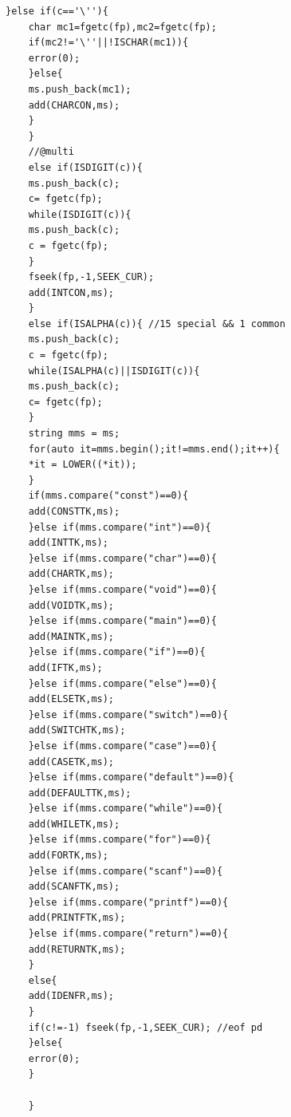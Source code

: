 \documentclass{ctexart}
\begin{document}
\begin{lstlisting}[caption=修改后核心代码]
	}else if(c=='\''){
	char mc1=fgetc(fp),mc2=fgetc(fp);
	if(mc2!='\''||!ISCHAR(mc1)){
	error(0);
	}else{
	ms.push_back(mc1);
	add(CHARCON,ms);
	}
	}
	//@multi
	else if(ISDIGIT(c)){ 
	ms.push_back(c);
	c= fgetc(fp);
	while(ISDIGIT(c)){
	ms.push_back(c);
	c = fgetc(fp);
	}
	fseek(fp,-1,SEEK_CUR);
	add(INTCON,ms);
	}
	else if(ISALPHA(c)){ //15 special && 1 common
	ms.push_back(c);
	c = fgetc(fp);
	while(ISALPHA(c)||ISDIGIT(c)){
	ms.push_back(c);
	c= fgetc(fp);
	}
	string mms = ms;
	for(auto it=mms.begin();it!=mms.end();it++){
	*it = LOWER((*it));
	}
	if(mms.compare("const")==0){
	add(CONSTTK,ms);
	}else if(mms.compare("int")==0){
	add(INTTK,ms);
	}else if(mms.compare("char")==0){
	add(CHARTK,ms);
	}else if(mms.compare("void")==0){
	add(VOIDTK,ms);
	}else if(mms.compare("main")==0){
	add(MAINTK,ms);
	}else if(mms.compare("if")==0){
	add(IFTK,ms);
	}else if(mms.compare("else")==0){
	add(ELSETK,ms);
	}else if(mms.compare("switch")==0){
	add(SWITCHTK,ms);
	}else if(mms.compare("case")==0){
	add(CASETK,ms);
	}else if(mms.compare("default")==0){
	add(DEFAULTTK,ms);
	}else if(mms.compare("while")==0){
	add(WHILETK,ms);
	}else if(mms.compare("for")==0){
	add(FORTK,ms);
	}else if(mms.compare("scanf")==0){
	add(SCANFTK,ms);
	}else if(mms.compare("printf")==0){
	add(PRINTFTK,ms);
	}else if(mms.compare("return")==0){
	add(RETURNTK,ms);
	}
	else{
	add(IDENFR,ms);
	}
	if(c!=-1) fseek(fp,-1,SEEK_CUR); //eof pd
	}else{
	error(0);
	}
	
	}
\end{lstlisting}
\end{document}
